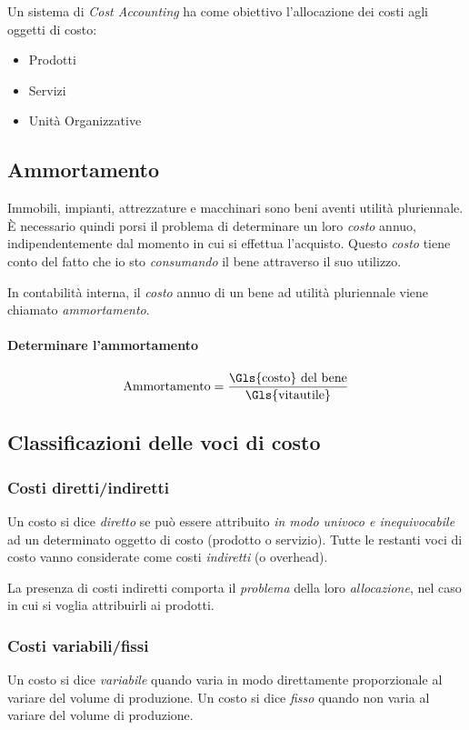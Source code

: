 Un sistema di \emph{Cost Accounting} ha come obiettivo l’allocazione
dei costi agli oggetti di costo:
\begin{itemize}
    \item Prodotti
    \item Servizi
    \item Unità Organizzative
\end{itemize}

\subsection{Ammortamento}
Immobili, impianti, attrezzature e macchinari sono beni aventi utilità
pluriennale. È necessario quindi porsi il problema di determinare un loro \emph{\gls{costo}}
annuo, indipendentemente dal momento in cui si effettua l’acquisto.
Questo \emph{costo} tiene conto del fatto che io sto \emph{consumando} il bene
attraverso il suo utilizzo.

In contabilità interna, il \emph{costo} annuo di un bene ad utilità pluriennale
viene chiamato \emph{\gls{ammortamento}}.

\paragraph{Determinare l'ammortamento} 
\begin{equation*}
    \text{Ammortamento} = \frac{\text{\Gls{costo} del bene}}{\text{\Gls{vitautile}}}
\end{equation*}

\subsection{Classificazioni delle voci di costo}

\subsubsection{Costi diretti/indiretti}
Un costo si dice \emph{diretto} se può essere attribuito \emph{in modo univoco e
inequivocabile} ad un determinato oggetto di costo (prodotto o
servizio).
Tutte le restanti voci di costo vanno considerate come costi \emph{indiretti} (o
overhead).

La presenza di costi indiretti comporta il \emph{problema} della loro
\emph{allocazione}, nel caso in cui si voglia attribuirli ai prodotti.

\subsubsection{Costi variabili/fissi}
Un costo si dice \emph{variabile} quando varia in modo direttamente
proporzionale al variare del volume di produzione. Un costo si dice \emph{fisso}
quando non varia al variare del volume di produzione.

